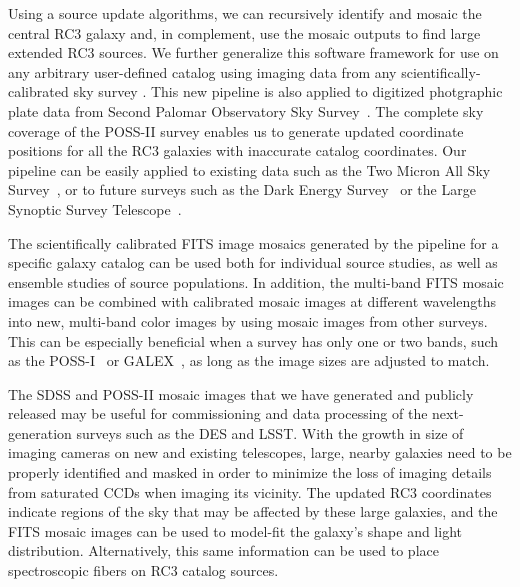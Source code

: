 \documentclass[authoryear, 12pt, 5p, times]{elsarticle}
\begin{document}
	Using a source update algorithms, we can recursively identify and mosaic the central RC3 galaxy and, in complement, use the mosaic outputs to find large extended RC3 sources. We further generalize this software framework %
 for use on any arbitrary user-defined catalog using imaging data from any scientifically-calibrated sky survey %
. This new pipeline is also applied to digitized photgraphic plate data from  Second Palomar Observatory Sky Survey~\citep[POSS-II;][]{poss2}. The complete sky coverage of the POSS-II survey enables us to generate updated coordinate positions for all the RC3 galaxies with inaccurate catalog coordinates.  Our pipeline can be easily applied to existing data such as the Two Micron All Sky Survey~\citep[2MASS;][]{2mass}, or to future surveys such as the Dark Energy Survey~\citep[DES;][]{des} or the Large Synoptic Survey Telescope~\citep[LSST;][]{lsst}. %

The scientifically calibrated FITS image mosaics generated by the pipeline for a specific galaxy catalog can be used both for individual source studies, as well as ensemble studies of source populations. In addition, the multi-band FITS mosaic images can be combined with calibrated mosaic images at different wavelengths into new, multi-band color images by using mosaic images from other surveys. This can be especially beneficial when a survey has only one or two bands, such as the POSS-I~\citep{poss1} or GALEX~\citep{galex}, as long as the image sizes are adjusted to match. 

The SDSS and POSS-II mosaic images that we have generated and publicly released may be useful for commissioning and data processing of the next-generation surveys such as the DES and LSST. %
With the growth in size of  imaging cameras on new and existing telescopes, large, nearby galaxies need to be properly identified and masked in order to minimize the loss of imaging details from saturated CCDs when imaging its vicinity. The updated RC3 coordinates indicate regions of the sky that may be affected by these large galaxies, and the FITS mosaic images can be used to model-fit the galaxy's shape and light distribution. Alternatively, this same information can be used to place spectroscopic fibers on RC3 catalog sources. 
\end{document}
